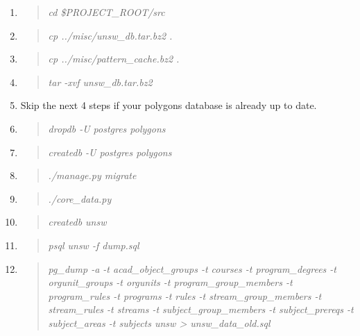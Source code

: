 \documentclass[12pt]{article}
\newenvironment{command}
   { 
      \begin{quote}\itshape
      \color{blue}
   }
   { \end{quote} }
\begin{document}
\begin{enumerate}
   \item \begin{command} cd \$PROJECT\_ROOT/src \end{command}
   \item \begin{command} cp ../misc/unsw\_db.tar.bz2 . \end{command}
   \item \begin{command} cp ../misc/pattern\_cache.bz2 . \end{command}
   \item \begin{command} tar -xvf unsw\_db.tar.bz2 \end{command}
   \item Skip the next 4 steps if your polygons database is already up to date.
   \item \begin{command} dropdb -U postgres polygons \end{command}
   \item \begin{command} createdb -U postgres polygons \end{command}
   \item \begin{command} ./manage.py migrate \end{command}
   \item \begin{command} ./core\_data.py \end{command}
   \item \begin{command} createdb unsw \end{command}
   \item \begin{command} psql unsw -f dump.sql \end{command}
   \item \begin{command} pg\_dump -a -t acad\_object\_groups -t courses -t
                         program\_degrees -t orgunit\_groups -t orgunits -t
                         program\_group\_members -t program\_rules -t programs
                         -t rules -t stream\_group\_members -t stream\_rules -t
                         streams -t subject\_group\_members -t subject\_prereqs
                         -t subject\_areas -t subjects unsw \textgreater
                         unsw\_data\_old.sql \end{command}

\end{enumerate}
\end{document}
